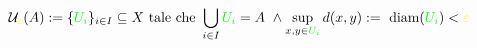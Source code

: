 \documentclass[preview]{standalone}
\begin{document}
\begin{align*}
\mathcal{U}_{\textcolor{yellow}{\varepsilon}}(A) :=  \{\textcolor{green}{U_i}\}_{i \in I} \subseteq X \text{ tale che } \bigcup_{i \in I} \textcolor{green}{U_i} = A  \ \land \sup_{x,y \in \textcolor{green}{U_i}} d(x,y) := \text{ diam}(\textcolor{green}{U_i}) < \textcolor{yellow}{\varepsilon}
\end{align*}
\end{document}
